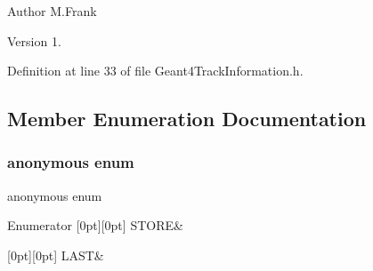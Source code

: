 \begin{DoxyAuthor}{Author}
M.\+Frank 
\end{DoxyAuthor}
\begin{DoxyVersion}{Version}
1. 
\end{DoxyVersion}


Definition at line 33 of file Geant4\+Track\+Information.\+h.



\subsection{Member Enumeration Documentation}
\hypertarget{class_d_d4hep_1_1_simulation_1_1_geant4_track_information_afa005d7916d394b13aeaee68fd11eb39}{}\label{class_d_d4hep_1_1_simulation_1_1_geant4_track_information_afa005d7916d394b13aeaee68fd11eb39} 
\subsubsection{\texorpdfstring{anonymous enum}{anonymous enum}}
{\footnotesize\ttfamily anonymous enum}

\begin{DoxyEnumFields}{Enumerator}
[0pt][0pt]{}\hypertarget{class_d_d4hep_1_1_simulation_1_1_geant4_track_information_afa005d7916d394b13aeaee68fd11eb39ae708756d2130a012dfbf610b5a185013}{}\label{class_d_d4hep_1_1_simulation_1_1_geant4_track_information_afa005d7916d394b13aeaee68fd11eb39ae708756d2130a012dfbf610b5a185013} 
S\+T\+O\+RE&\\
\hline

[0pt][0pt]{}\hypertarget{class_d_d4hep_1_1_simulation_1_1_geant4_track_information_afa005d7916d394b13aeaee68fd11eb39a81ac210b79462efbc46ab716df41e891}{}\label{class_d_d4hep_1_1_simulation_1_1_geant4_track_information_afa005d7916d394b13aeaee68fd11eb39a81ac210b79462efbc46ab716df41e891} 
L\+A\+ST&\\
\hline

\end{DoxyEnumFields}


